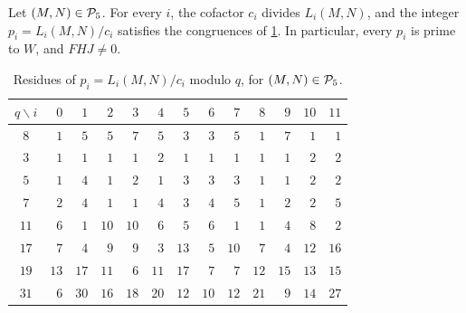 \begin{lemma}\label{lem:r5-progression}
Let $(M,N)\in\mathcal P_5$. For every $i$, the cofactor $c_i$ divides $L_i(M,N)$, and the integer $p_i=L_i(M,N)/c_i$ satisfies the congruences of \cref{tab:r5-residues}. In particular, every $p_i$ is prime to $W$, and $FHJ\ne0$.
\end{lemma}

\begin{table}[htbp]
\centering
\caption{Residues of $p_i=L_i(M,N)/c_i$ modulo $q$, for $(M,N)\in\mathcal P_5$.}\label{tab:r5-residues}
\begin{tabular}{c*{12}{r}}
\toprule
$q\backslash i$ & $0$ & $1$ & $2$ & $3$ & $4$ & $5$ & $6$ & $7$ & $8$ & $9$ & $10$ & $11$\\
\midrule
$8$ & $1$ & $5$ & $5$ & $7$ & $5$ & $3$ & $3$ & $5$ & $1$ & $7$ & $1$ & $1$\\
$3$ & $1$ & $1$ & $1$ & $1$ & $2$ & $1$ & $1$ & $1$ & $1$ & $1$ & $2$ & $2$\\
$5$ & $1$ & $4$ & $1$ & $2$ & $1$ & $3$ & $3$ & $3$ & $1$ & $1$ & $2$ & $2$\\
$7$ & $2$ & $4$ & $1$ & $1$ & $4$ & $3$ & $4$ & $5$ & $1$ & $2$ & $2$ & $5$\\
$11$ & $6$ & $1$ & $10$ & $10$ & $6$ & $5$ & $6$ & $1$ & $1$ & $4$ & $8$ & $2$\\
$17$ & $7$ & $4$ & $9$ & $9$ & $3$ & $13$ & $5$ & $10$ & $7$ & $4$ & $12$ & $16$\\
$19$ & $13$ & $17$ & $11$ & $6$ & $11$ & $17$ & $7$ & $7$ & $12$ & $15$ & $13$ & $15$\\
$31$ & $6$ & $30$ & $16$ & $18$ & $20$ & $12$ & $10$ & $12$ & $21$ & $9$ & $14$ & $27$\\
\bottomrule
\end{tabular}
\end{table}

